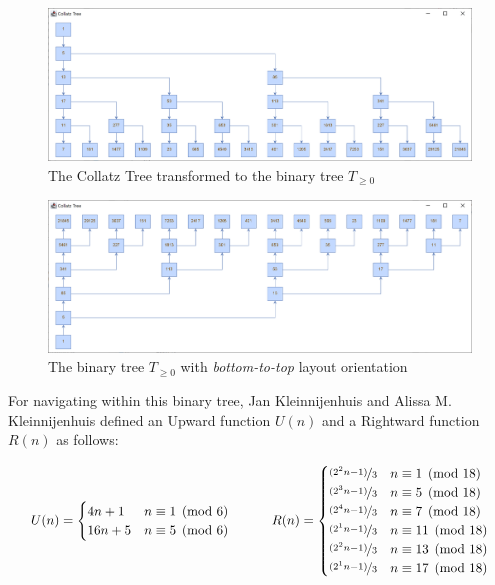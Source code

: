 \begin{figure}[H]
	\includegraphics[width=1.00\textwidth]{figures/bt_3.png}
	\caption{The Collatz Tree transformed to the binary tree $T_{\ge0}$}
	\label{fig:bt3}
\end{figure}

\begin{figure}[H]
	\includegraphics[width=1.00\textwidth]{figures/bt_3_rot.png}
	\caption{The binary tree $T_{\ge0}$ with \textit{bottom-to-top} layout orientation}
	\label{fig:bt3_rot}
\end{figure}

For navigating within this binary tree, Jan Kleinnijenhuis and Alissa M. Kleinnijenhuis \cite{Ref_Kleinnijenhuis} defined an Upward function $U(n)$ and a Rightward function $R(n)$ as follows:

\begin{equation}
\label{eq:bintree_3_rightward_upward}
\setlength{\arraycolsep}{1.6em}
\begin{array}{cc}
U(n)=\begin{cases}
        4n+1	&	n\equiv 1\pmod 6\\
        16n+5	&	n\equiv 5\pmod 6
    \end{cases} &
R(n)=\begin{cases}
    \nicefrac{(2^2n-1)}{3}	&	n\equiv 1\pmod{18}\\
    \nicefrac{(2^3n-1)}{3}	&	n\equiv 5\pmod{18}\\
    \nicefrac{(2^4n-1)}{3}	&	n\equiv 7\pmod{18}\\
    \nicefrac{(2^1n-1)}{3}	&	n\equiv 11\pmod{18}\\
    \nicefrac{(2^2n-1)}{3}	&	n\equiv 13\pmod{18}\\
    \nicefrac{(2^1n-1)}{3}	&	n\equiv 17\pmod{18}
\end{cases}
\end{array}
\end{equation}


